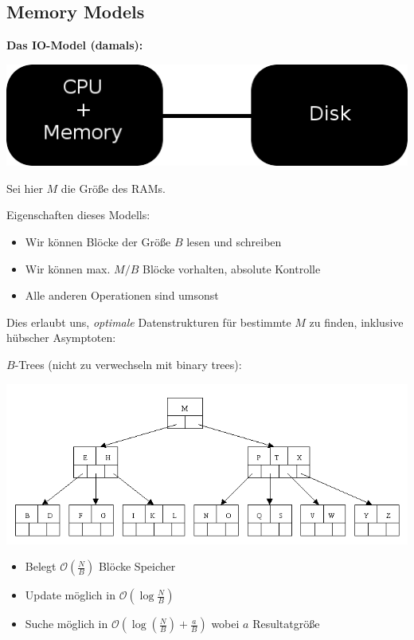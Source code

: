 \documentclass{beamer}
\begin{document}
\subsection{Memory Models}

\begin{frame}
\textbf{Das IO-Model (damals):}

\begin{center}
\includegraphics[scale=0.375]{model1.png} 
\end{center}
Sei hier $M$ die Größe des RAMs.\smallskip\smallskip
\pause

Eigenschaften dieses Modells:
\begin{itemize}
\item Wir können Blöcke der Größe $B$ lesen und schreiben\pause
\item Wir können max. $M/B$ Blöcke vorhalten, absolute Kontrolle\pause
\item Alle anderen Operationen sind \glqq umsonst\grqq
\end{itemize}
\end{frame}


\begin{frame}
Dies erlaubt uns, \emph{optimale} Datenstrukturen für bestimmte $M$ zu finden, inklusive
hübscher Asymptoten:\pause\bigskip

$B$-Trees (nicht zu verwechseln mit binary trees):
\begin{center}
\includegraphics[scale=0.35]{btree1.png}
\end{center}
\pause

\begin{itemize}
\item Belegt $\mathcal{O}(\frac{N}{B})$ Blöcke Speicher
\item Update möglich in $\mathcal{O}(\log{}\frac{N}{B})$
\item Suche möglich in $\mathcal{O}(\log{\left(\frac{N}{B}\right)} + \frac{a}{B})$ wobei $a$ Resultatgröße
\end{itemize}
\end{frame}
\end{document}
